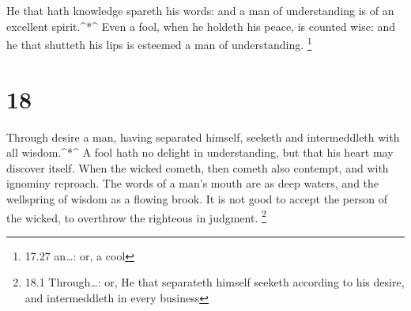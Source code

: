  He that hath knowledge spareth his words: and a man of
understanding is of an excellent spirit.\^{}*\^{}  Even a
fool, when he holdeth his peace, is counted wise: and he that shutteth
his lips is esteemed a man of understanding. \footnote{17.27 an\ldots:
  or, a cool}

\hypertarget{section-17}{%
\section{18}\label{section-17}}

 Through desire a man, having separated himself, seeketh and
intermeddleth with all wisdom.\^{}*\^{}  A fool hath no
delight in understanding, but that his heart may discover itself.
 When the wicked cometh, then cometh also contempt, and with
ignominy reproach.  The words of a man's mouth are as deep
waters, and the wellspring of wisdom as a flowing brook.  It
is not good to accept the person of the wicked, to overthrow the
righteous in judgment. \footnote{18.1 Through\ldots: or, He that
  separateth himself seeketh according to his desire, and intermeddleth
  in every business}

